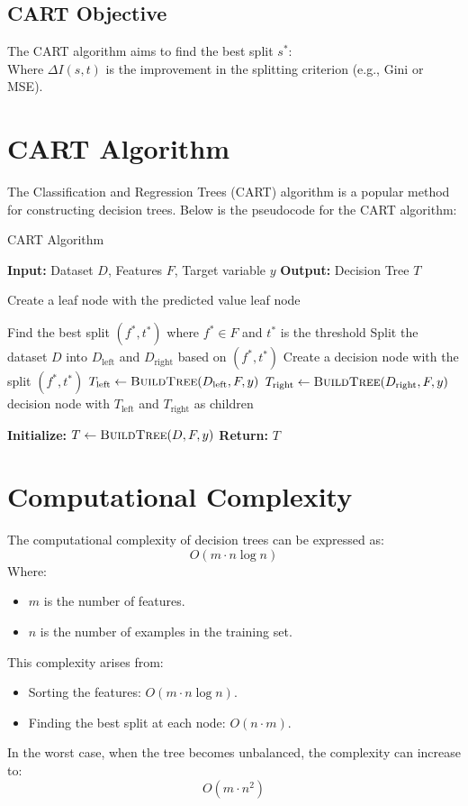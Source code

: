 \documentclass{article}
\begin{document}
\subsection*{CART Objective}
The CART algorithm aims to find the best split $s^*$:
\[
\]
Where $\Delta I(s,t)$ is the improvement in the splitting criterion (e.g., Gini or MSE).

\section*{CART Algorithm}
The Classification and Regression Trees (CART) algorithm is a popular method for constructing decision trees. Below is the pseudocode for the CART algorithm:

\begin{algorithm}
\caption{CART Algorithm}
\label{cart_algorithm}
\begin{algorithmic}[1]
\State \textbf{Input:} Dataset $D$, Features $F$, Target variable $y$
\State \textbf{Output:} Decision Tree $T$

        \State Create a leaf node with the predicted value
        \State \Return leaf node
    \EndIf

    \State Find the best split $(f^*, t^*)$ where $f^* \in F$ and $t^*$ is the threshold
    \State Split the dataset $D$ into $D_{\text{left}}$ and $D_{\text{right}}$ based on $(f^*, t^*)$
    \State Create a decision node with the split $(f^*, t^*)$
    \State $T_{\text{left}} \gets \Call{BuildTree}{D_{\text{left}}, F, y}$
    \State $T_{\text{right}} \gets \Call{BuildTree}{D_{\text{right}}, F, y}$
    \State \Return decision node with $T_{\text{left}}$ and $T_{\text{right}}$ as children
\EndProcedure

\State \textbf{Initialize:} $T \gets \Call{BuildTree}{D, F, y}$
\State \textbf{Return:} $T$
\end{algorithmic}
\end{algorithm}

\section*{Computational Complexity}
The computational complexity of decision trees can be expressed as:
\[
O(m \cdot n \log n)
\]
Where:
\begin{itemize}
    \item $m$ is the number of features.
    \item $n$ is the number of examples in the training set.
\end{itemize}
This complexity arises from:
\begin{itemize}
    \item Sorting the features: $O(m \cdot n \log n)$.
    \item Finding the best split at each node: $O(n \cdot m)$.
\end{itemize}
In the worst case, when the tree becomes unbalanced, the complexity can increase to:
\[
O(m \cdot n^2)
\]
\end{document}
